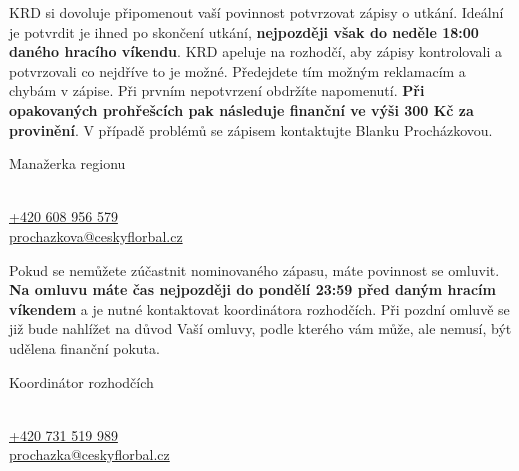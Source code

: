 \documentclass{newsletter}
\begin{document}
\pagebreak
{}
KRD si dovoluje připomenout vaší povinnost potvrzovat zápisy o utkání. Ideální je potvrdit je ihned po skončení utkání, \textbf{nejpozději však do neděle 18:00 daného hracího víkendu}. KRD apeluje na rozhodčí, aby zápisy kontrolovali a potvrzovali co nejdříve to je možné. Předejdete tím možným reklamacím a chybám v zápise. Při prvním nepotvrzení obdržíte napomenutí. \textbf{Při opakovaných prohřešcích pak následuje finanční  ve výši 300 Kč za provinění}. V případě problémů se zápisem kontaktujte Blanku Procházkovou.

\begin{admonition-info}{Manažerka regionu}
	\begin{flushleft}
		\hspace{0.5em} %
		\parbox{8cm}{ %
			\textcolor{cfblue}{{\large {}}}
			\\
			{\small \href{tel:608956579}{+420 608 956 579}}\\
			{\small \href{mailto:prochazkova@ceskyflorbal.cz}{prochazkova@ceskyflorbal.cz}}
		}
	\end{flushleft}
\end{admonition-info}

Pokud se nemůžete zúčastnit nominovaného zápasu, máte povinnost se omluvit. \textbf{Na omluvu máte čas nejpozději do pondělí 23:59 před daným hracím víkendem} a je nutné kontaktovat koordinátora rozhodčích. Při pozdní omluvě se již bude nahlížet na důvod Vaší omluvy, podle kterého vám může, ale nemusí, být udělena finanční pokuta.

\begin{admonition-info}{Koordinátor rozhodčích}
    \begin{flushleft}
	\hspace{0.5em} %
	\parbox{8cm}{ %
		\textcolor{cfblue}{{\large \GeogrotesqueCondensedBold{Jakub Procházka}}}
		\\
		{\small \href{tel:731519989}{+420 731 519 989}}\\
		{\small \href{mailto:prochazka@ceskyflorbal.cz}{prochazka@ceskyflorbal.cz}}
	}
\end{flushleft}
\end{admonition-info}
\end{document}
